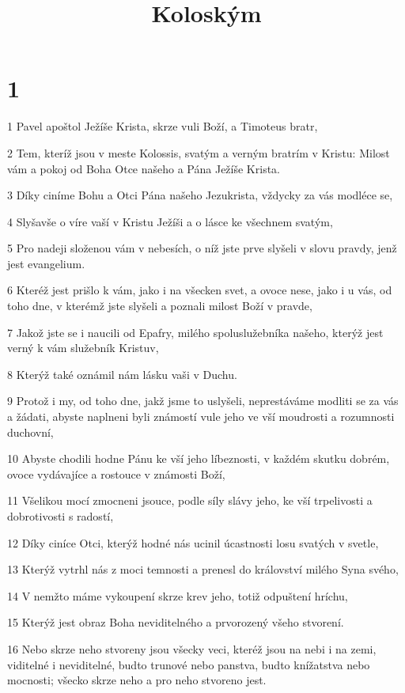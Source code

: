 

\title{Koloským}

\chapter{1}

\par 1 Pavel apoštol Ježíše Krista, skrze vuli Boží, a Timoteus bratr,
\par 2 Tem, kteríž jsou v meste Kolossis, svatým a verným bratrím v Kristu: Milost vám a pokoj od Boha Otce našeho a Pána Ježíše Krista.
\par 3 Díky ciníme Bohu a Otci Pána našeho Jezukrista, vždycky za vás modléce se,
\par 4 Slyšavše o víre vaší v Kristu Ježíši a o lásce ke všechnem svatým,
\par 5 Pro nadeji složenou vám v nebesích, o níž jste prve slyšeli v slovu pravdy, jenž jest evangelium.
\par 6 Kteréž jest prišlo k vám, jako i na všecken svet, a ovoce nese, jako i u vás, od toho dne, v kterémž jste slyšeli a poznali milost Boží v pravde,
\par 7 Jakož jste se i naucili od Epafry, milého spoluslužebníka našeho, kterýž jest verný k vám služebník Kristuv,
\par 8 Kterýž také oznámil nám lásku vaši v Duchu.
\par 9 Protož i my, od toho dne, jakž jsme to uslyšeli, neprestáváme modliti se za vás a žádati, abyste naplneni byli známostí vule jeho ve vší moudrosti a rozumnosti duchovní,
\par 10 Abyste chodili hodne Pánu ke vší jeho líbeznosti, v každém skutku dobrém, ovoce vydávajíce a rostouce v známosti Boží,
\par 11 Všelikou mocí zmocneni jsouce, podle síly slávy jeho, ke vší trpelivosti a dobrotivosti s radostí,
\par 12 Díky ciníce Otci, kterýž hodné nás ucinil úcastnosti losu svatých v svetle,
\par 13 Kterýž vytrhl nás z moci temnosti a prenesl do království milého Syna svého,
\par 14 V nemžto máme vykoupení skrze krev jeho, totiž odpuštení hríchu,
\par 15 Kterýž jest obraz Boha neviditelného a prvorozený všeho stvorení.
\par 16 Nebo skrze neho stvoreny jsou všecky veci, kteréž jsou na nebi i na zemi, viditelné i neviditelné, budto trunové nebo panstva, budto knížatstva nebo mocnosti; všecko skrze neho a pro neho stvoreno jest.
